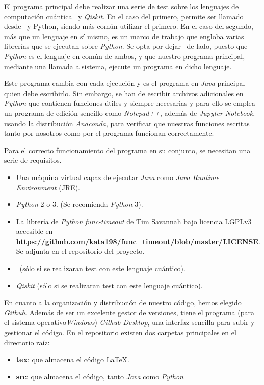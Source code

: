 El programa principal debe realizar una serie de test sobre los lenguajes de computación cuántica \qsh\ y \textit{Qiskit}. En el caso del primero, permite ser llamado desde \csh\ y {Python}, siendo más común utilizar el primero. En el caso del segundo, más que un lenguaje en sí mismo, es un marco de trabajo que engloba varias librerías que se ejecutan sobre \textit{Python}. Se opta por dejar \csh\ de lado, puesto que \textit{Python} es el lenguaje en común de ambos, y que nuestro programa principal, mediante una llamada a sistema, ejecute un programa en dicho lenguaje.

Este programa cambia con cada ejecución y es el programa en \textit{Java} principal quien debe escribirlo. Sin embargo, se han de escribir archivos adicionales en \textit{Python} que contienen funciones útiles y siempre necesarias y para ello se emplea un programa de edición sencillo como \textit{Notepad++}, además de \textit{Jupyter Notebook}, usando la distribución \textit{Anaconda}, para verificar que nuestras funciones escritas tanto por nosotros como por el programa funcionan correctamente.

Para el correcto funcionamiento del programa en su conjunto, se necesitan una serie de requisitos.

\begin{itemize}
\item Una máquina virtual capaz de ejecutar \textit{Java} como \textit{Java Runtime Environment} (JRE).
\item \textit{Python} 2 o 3. (Se recomienda \textit{Python} 3).
\item La librería de \textit{Python} \textit{func-timeout} de Tim Savannah bajo licencia LGPLv3 accesible en \textbf{https://github.com/kata198/func\_timeout/blob/master/LICENSE}. Se adjunta en el repositorio del proyecto.
\item \qsh\ (sólo si se realizaran test con este lenguaje cuántico).
\item \textit{Qiskit} (sólo si se realizaran test con este lenguaje cuántico).
\end{itemize}

En cuanto a la organización y distribución de nuestro código, hemos elegido \textit{Github}. Además de ser un excelente gestor de versiones, tiene el programa (para el sistema operativo\textit{Windows}) \textit{Github Desktop}, una interfaz sencilla para subir y gestionar el código. En el repositorio existen dos carpetas principales en el directorio raíz:

\begin{itemize}
\item \textbf{tex}: que almacena el código \LaTeX.
\item \textbf{src}: que almacena el código, tanto \textit{Java} como \textit{Python}
\end{itemize}

